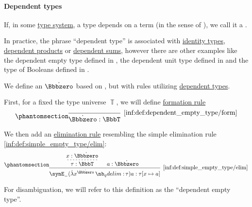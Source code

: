 \paragraph{Dependent types}

\begin{concept}\label{con:dependent_type}
  If, in some \hyperref[def:abstract_type_system]{type system}, a type depends on a term (in the sense of ), we call it a .
\end{concept}
\begin{comments}
  \item In practice, the phrase \enquote{dependent type} is associated with \hyperref[def:identity_type]{identity types}, \hyperref[def:dependent_product]{dependent products} or \hyperref[def:dependent_product]{dependent sums}, however there are other examples like the dependent empty type defined in , the dependent unit type defined in  and the type of Booleans defined in .
\end{comments}

\begin{definition}\label{def:dependent_empty_type}
  We define an  \( \syn\Bbbzero \) based on , but with rules utilizing \hyperref[con:dependent_type]{dependent types}.

  First, for a fixed the type universe \( \BbbT \), we will define \hyperref[rem:type_theory_rule_classification/form]{formation rule}
  \begin{equation*}\taglabel[\ensuremath{ \Bbbzero_{\logic{form}} }]{inf:def:dependent_empty_type/form}
    \begin{prooftree}
      \infer0[\ref{inf:def:dependent_empty_type/form}]{ \syn\Bbbzero: \BbbT }
    \end{prooftree}
  \end{equation*}

  We then add an \hyperref[rem:type_theory_rule_classification/elim]{elimination rule} resembling the simple elimination rule \ref{inf:def:simple_empty_type/elim}:
  \begin{equation*}\taglabel[\ensuremath{ \Bbbzero_- }]{inf:def:dependent_empty_type/elim}
    \begin{prooftree}
      \hypo{ x: \syn\Bbbzero }
      \infer[dashed]1{ \tau: \BbbT }

      \hypo{ a: \syn\Bbbzero }

      \infer2[\ref{inf:def:simple_empty_type/elim}]{ \synE_- (\qabs {x^{\syn\Bbbzero}} \tau) a: \tau[x \mapsto a] }
    \end{prooftree}
  \end{equation*}
\end{definition}
\begin{comments}
  \item For disambiguation, we will refer to this definition as the \enquote{dependent empty type}.
\end{comments}

